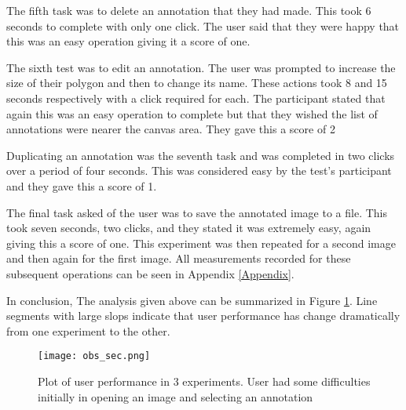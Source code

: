 The fifth task was to delete an annotation that they had made.  This took 6 seconds to complete with only one click.  The user said that they were happy that this was an easy operation giving it a score of one.

The sixth test was to edit an annotation.  The user was prompted to increase the size of their polygon and then to change its name.  These actions took 8 and 15 seconds respectively with a click required for each.  The participant stated that again this was an easy operation to complete but that they wished the list of annotations were nearer the canvas area.  They gave this a score of 2

Duplicating an annotation was the seventh task and was completed in two clicks over a period of four seconds.  This was considered easy by the test's participant and they gave this a score of 1.

The final task asked of the user was to save the annotated image to a file.  This took seven seconds, two clicks, and they stated it was extremely easy, again giving this a score of one.  This experiment was then repeated for a second image and then again for the first image.  All measurements recorded for these subsequent operations can be seen in Appendix \ref{Appendix}.

In conclusion, The analysis given above can be summarized in Figure \ref{fig:plot}. Line segments with large slops indicate that user performance has change dramatically from one experiment to the other.

\begin{figure}[t]
\centering
\texttt{[image: obs\_sec.png]}
\caption{Plot of user performance in 3 experiments. User had some difficulties initially in opening an image and selecting an annotation}
\label{fig:plot}
\end{figure}
